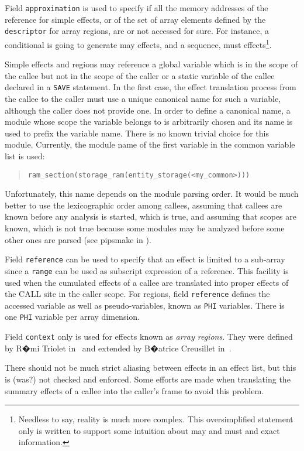 \documentclass[a4paper]{article}
\begin{document}
Field \verb/approximation/ is used to specify if all the memory addresses
of the reference for simple effects, or of the set of array elements
defined by the \verb/descriptor/ for array regions, are or not
accessed for sure. For instance, a conditional is going to generate
may effects, and a sequence, must effects\footnote{Needless to say,
  reality is much more complex. This oversimplified statement only is
  written to support some intuition about may and must and exact
  information.}.

Simple effects and regions may reference a global variable which is in
the scope of the callee but not in the scope of the caller or a static
variable of the callee declared in a \verb/SAVE/ statement. In the first
case, the effect translation process from the callee to the caller must
use a unique canonical name for such a variable, although the caller
does not provide one. In order to define a canonical name, a module
whose scope the variable belongs to is arbitrarily chosen and its name
is used to prefix the variable name. There is no known trivial choice
for this module. Currently, the module name of the first variable in the
common variable list is used:
\begin{quote}
 \texttt{ram\_section(storage\_ram(entity\_storage(<my\_common>)))}
\end{quote}
Unfortunately, this name depends on the module parsing order. It would
be much better to use the lexicographic order among callees, assuming
that callees are known before any analysis is started, which is true,
and assuming that scopes are known, which is not true because some
modules may be analyzed before some other ones are parsed (see pipsmake
in \cite{Trio90}\cite{Baro91}).

Field \verb/reference/ can be used to specify that an effect is limited
to a sub-array since a \verb/range/ can be used as subscript expression
of a reference. This facility is used when the cumulated effects of a
callee are translated into proper effects of the CALL site in the caller
scope. For regions, field \verb/reference/ defines the accessed variable
as well as pseudo-variables, known as \verb/PHI/ variables. There is one
\verb/PHI/ variable per array dimension.

Field \verb/context/ only is used for effects known as \emph{array
regions}. They were defined by R�mi Triolet in~\cite{Trio84} and
extended by B�atrice Creusillet in~\cite{Creu96}.

There should not be much strict aliasing between effects in an effect
list, but this is (was?) not checked and enforced. Some efforts are
made when translating the summary effects of a callee into the
caller's frame to avoid this problem.
\end{document}
